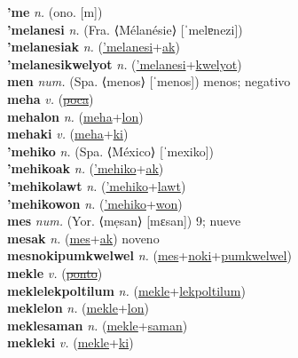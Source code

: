 \textbf{'me} \textit{n.} (ono. [m])
 \label{'me} \\
\textbf{'melanesi} \textit{n.} (Fra. ⟨Mélanésie⟩ [ˈmelɐnezi])
 \label{'melanesi} \\
\textbf{'melanesiak} \textit{n.} (\hyperref['melanesi]{'melanesi}+\hyperref[ak]{ak})
 \label{'melanesiak} \\
\textbf{'melanesikwelyot} \textit{n.} (\hyperref['melanesi]{'melanesi}+\hyperref[kwelyot]{kwelyot})
 \label{'melanesikwelyot} \\
\textbf{men} \textit{num.} (Spa. ⟨menos⟩ [ˈmenos])
menos; negativo \label{men} \\
\textbf{meha} \textit{v.} (\hyperref[poca]{\sout{poca}})
 \label{meha} \\
\textbf{mehalon} \textit{n.} (\hyperref[meha]{meha}+\hyperref[lon]{lon})
 \label{mehalon} \\
\textbf{mehaki} \textit{v.} (\hyperref[meha]{meha}+\hyperref[ki]{ki})
 \label{mehaki} \\
\textbf{'mehiko} \textit{n.} (Spa. ⟨México⟩ [ˈmexiko])
 \label{'mehiko} \\
\textbf{'mehikoak} \textit{n.} (\hyperref['mehiko]{'mehiko}+\hyperref[ak]{ak})
 \label{'mehikoak} \\
\textbf{'mehikolawt} \textit{n.} (\hyperref['mehiko]{'mehiko}+\hyperref[lawt]{lawt})
 \label{'mehikolawt} \\
\textbf{'mehikowon} \textit{n.} (\hyperref['mehiko]{'mehiko}+\hyperref[won]{won})
 \label{'mehikowon} \\
\textbf{mes} \textit{num.} (Yor. ⟨mẹsan⟩ [mɛsan])
9; nueve \label{mes} \\
\textbf{mesak} \textit{n.} (\hyperref[mes]{mes}+\hyperref[ak]{ak})
noveno \label{mesak} \\
\textbf{mesnokipumkwelwel} \textit{n.} (\hyperref[mes]{mes}+\hyperref[noki]{noki}+\hyperref[pumkwelwel]{pumkwelwel})
 \label{mesnokipumkwelwel} \\
\textbf{mekle} \textit{v.} (\hyperref[ponto]{\sout{ponto}})
 \label{mekle} \\
\textbf{meklelekpoltilum} \textit{n.} (\hyperref[mekle]{mekle}+\hyperref[lekpoltilum]{lekpoltilum})
 \label{meklelekpoltilum} \\
\textbf{meklelon} \textit{n.} (\hyperref[mekle]{mekle}+\hyperref[lon]{lon})
 \label{meklelon} \\
\textbf{meklesaman} \textit{n.} (\hyperref[mekle]{mekle}+\hyperref[saman]{saman})
 \label{meklesaman} \\
\textbf{mekleki} \textit{v.} (\hyperref[mekle]{mekle}+\hyperref[ki]{ki})
